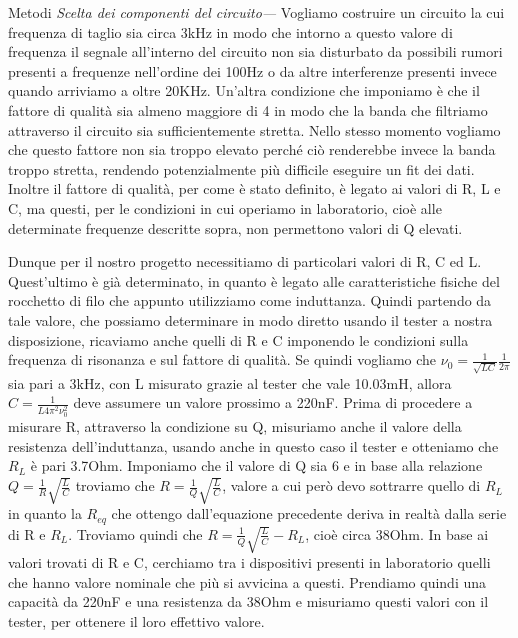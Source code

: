\documentclass[
    prl,
    floatfix,
    reprint, 
    superscriptaddress, 
    altaffilletter, 
    amsmath, 
    amssymb, 
    a4paper]{revtex4-2}
\begin{document}
\begin{methods}{Metodi}
    \noindent\textit{Scelta dei componenti del circuito---}\label{par:caratterizzazioneRLC} Vogliamo costruire un circuito la cui frequenza di taglio sia circa 3kHz in modo che intorno a questo valore di frequenza il segnale all'interno del circuito non sia disturbato da possibili rumori presenti a frequenze nell'ordine dei 100Hz o da altre interferenze presenti invece quando arriviamo a oltre 20KHz. Un'altra condizione che imponiamo è che il fattore di qualità sia almeno maggiore di 4 in modo che la banda che filtriamo attraverso il circuito sia sufficientemente stretta. Nello stesso momento vogliamo che questo fattore non sia troppo elevato perch\'e ci\`o renderebbe invece la banda troppo stretta, rendendo potenzialmente più difficile eseguire un fit dei dati. Inoltre il fattore di qualità, per come è stato definito, è legato ai valori di R, L e C, ma questi, per le condizioni in cui operiamo in laboratorio, cioè alle determinate frequenze descritte sopra, non permettono valori di Q elevati. 
    
    Dunque per il nostro progetto necessitiamo di particolari valori di R, C ed L. Quest'ultimo è già determinato, in quanto è legato alle caratteristiche fisiche del rocchetto di filo che appunto utilizziamo come induttanza. Quindi partendo da tale valore, che possiamo determinare in modo diretto usando il tester a nostra disposizione, ricaviamo anche quelli di R e C imponendo le condizioni sulla frequenza di risonanza e sul fattore di qualità. Se quindi vogliamo che $\nu_{0}=\frac{1}{\sqrt{LC}}\frac{1}{2\pi}$ sia pari a 3kHz, con L misurato grazie al tester che vale 10.03mH, allora $C=\frac{1}{L4\pi^2\nu_{0}^2}$ deve assumere un valore prossimo a 220nF. Prima di procedere a misurare R, attraverso la condizione su Q, misuriamo anche il valore della resistenza dell'induttanza, usando anche in questo caso il tester e otteniamo che $R_{L}$ è pari 3.7Ohm. Imponiamo che il valore di Q sia 6 e in base alla relazione $Q=\frac{1}{R}\sqrt{\frac{L}{C}}$ troviamo che $R=\frac{1}{Q}\sqrt{\frac{L}{C}}$, valore a cui però devo sottrarre quello di $R_{L}$ in quanto la $R_{eq}$ che ottengo dall'equazione precedente deriva in realtà dalla serie di R e $R_{L}$. Troviamo quindi che $R=\frac{1}{Q}\sqrt{\frac{L}{C}}-R_{L}$, cioè circa 38Ohm. In base ai valori trovati di R e C, cerchiamo tra i dispositivi presenti in laboratorio quelli che hanno valore nominale che più si avvicina a questi. Prendiamo quindi una capacità da 220nF e una resistenza da 38Ohm e misuriamo questi valori con il tester, per ottenere il loro effettivo valore. 
    

\end{methods}
\end{document}
